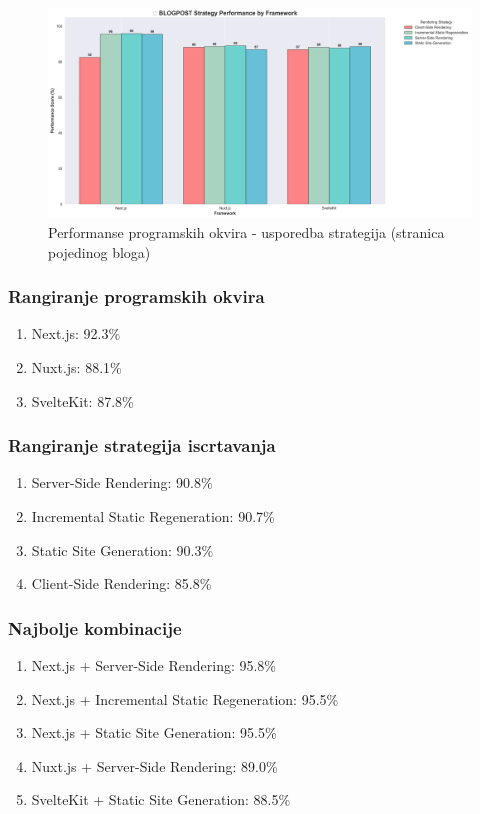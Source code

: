 \begin{figure}[H]
    \centering
    \includegraphics[width=\textwidth]{slike/rezultati/blog-post/blogPost_strategy_comparison.png}
    \caption{Performanse programskih okvira - usporedba strategija (stranica pojedinog bloga) }
    \label{fig:testiranje-blog-post-usporedba-strategija}
\end{figure}

\newpage
\subsubsection{Rangiranje programskih okvira}
\begin{enumerate}
    \item Next.js: 92.3\%
    \item Nuxt.js: 88.1\%
    \item SvelteKit: 87.8\%
\end{enumerate}

\subsubsection{Rangiranje strategija iscrtavanja}
\begin{enumerate}
    \item Server-Side Rendering: 90.8\%
    \item Incremental Static Regeneration: 90.7\%
    \item Static Site Generation: 90.3\%
    \item Client-Side Rendering: 85.8\%
\end{enumerate}

\subsubsection{Najbolje kombinacije}
\begin{enumerate}
    \item Next.js + Server-Side Rendering: 95.8\%
    \item Next.js + Incremental Static Regeneration: 95.5\%
    \item Next.js + Static Site Generation: 95.5\%
    \item Nuxt.js + Server-Side Rendering: 89.0\%
    \item SvelteKit + Static Site Generation: 88.5\%
\end{enumerate}


